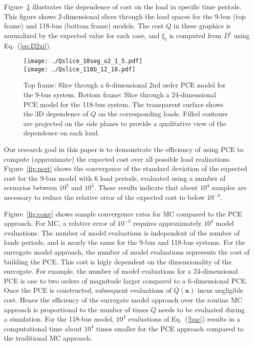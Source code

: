 \documentclass[conference]{IEEEtran}
\begin{document}
Figure~\ref{fig:pcslice} illustrates the dependence of cost on the
load in specific time periods. This figure shows 2-dimensional slices
through the load spaces for the 9-bus (top frame) and 118-bus (bottom
frame) models. The cost $Q$ in these graphics is normalized by the
expected value for each case, and $\xi_t$ is computed from $D^t$ using Eq.~(\ref{eq:D2xi}).
\begin{figure}[h]
\centering 
\texttt{[image: ./Qslice\_10seg\_o2\_1\_5.pdf]} \\
\texttt{[image: ./Qslice\_118b\_12\_18.pdf]} 
\caption{\label{fig:pcslice} Top frame: Slice through a 6-dimensional
  2nd order PCE model for the 9-bus system. Bottom frame: Slice
  through a 24-dimensional PCE model for the 118-bus system. The
  transparent surface shows the 3D dependence of $Q$ on the
  corresponding loads. Filled contours are projected on the side
  planes to provide a qualitative view of the dependence on each
  load.}
\end{figure}

Our research goal in this paper is to demonstrate the efficiency of using
PCE to compute (approximate)
the expected cost over all possible load realizations. 
Figure~\ref{fig:pcst} shows the convergence of the standard deviation of
the expected cost for the 9-bus model with 6 load periods, evaluated
using a number of scenarios between $10^2$ and $10^5$. These results
indicate that about $10^4$ samples are necessary to reduce the
relative error of the expected cost to below $10^{-3}$. 

Figure~\ref{fig:conv} shows sample convergence rates for MC
compared to the PCE approach. For MC, a relative error of
$10^{-3}$ requires approximately $10^4$ model evaluations. The number of model
evaluations is independent of the number of loads periods, and is
nearly the same for the 9-bus and 118-bus systems. For the
surrogate model approach, the number of model evaluations represents
the cost of building the PCE. This cost is higly dependent on the
dimensionality of the surrogate. For example, the number of model
evaluations for a 24-dimensional PCE is one to two orders of magnitude
larger compared to a 6-dimensional PCE. Once the PCE is constructed,
subsequent evaluations of $\overline Q(\bm{x})$
incur negligible cost.
Hence the efficiency of the surrogate model approach over the
routine MC approach is proportional to the number of times  $\overline
Q$ needs to be evaluated during a simulation. For the
118-bus model, $10^3$ evaluations of Eq.~(\ref{buc}) results in a
computational time about $10^4$ times smaller for the PCE approach
compared to the traditional MC approach.
\end{document}
